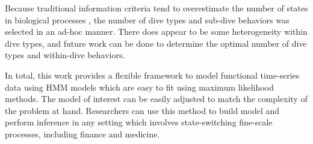 
Because traditional information criteria tend to overestimate the number of states in biological processes \citep{Pohle:2017}, the number of dive types and sub-dive behaviors was selected in an ad-hoc manner. There does appear to be some heterogeneity within dive types, and future work can be done to determine the optimal number of dive types and within-dive behaviors.

In total, this work provides a flexible framework to model functional time-series data using HMM models which are easy to fit using maximum likelihood methods. The model of interest can be easily adjusted to match the complexity of the problem at hand. Researchers can use this method to build model and perform inference in any setting which involves state-switching fine-scale processes, including finance and medicine. 